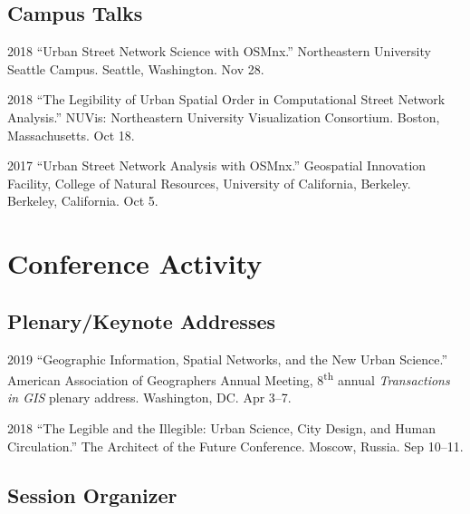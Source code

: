 \documentclass[12pt,letterpaper]{report}
\begin{document}
    \subsection*{Campus Talks}

    \begin{tablist}

        \item[2018] \tab \enquote{Urban Street Network Science with OSMnx.} Northeastern University Seattle Campus. Seattle, Washington. Nov 28.

        \item[2018] \tab \enquote{The Legibility of Urban Spatial Order in Computational Street Network Analysis.} NUVis: Northeastern University Visualization Consortium. Boston, Massachusetts. Oct 18.

        \item[2017] \tab \enquote{Urban Street Network Analysis with OSMnx.} Geospatial Innovation Facility, College of Natural Resources, University of California, Berkeley. Berkeley, California. Oct 5.

    \end{tablist}


    \section*{Conference Activity}

    \subsection*{Plenary/Keynote Addresses}

    \begin{tablist}

        \item[2019] \tab \enquote{Geographic Information, Spatial Networks, and the New Urban Science.} American Association of Geographers Annual Meeting, 8\textsuperscript{th} annual \emph{Transactions in GIS} plenary address. Washington, DC. Apr 3--7.

        \item[2018] \tab \enquote{The Legible and the Illegible: Urban Science, City Design, and Human Circulation.} The Architect of the Future Conference. Moscow, Russia. Sep 10--11.

    \end{tablist}

    \subsection*{Session Organizer}
\end{document}
